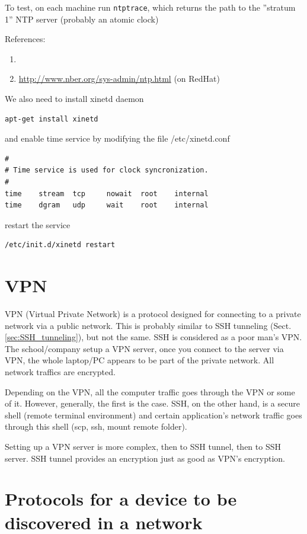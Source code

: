   
To test, on each machine run \verb!ntptrace!, which returns the path to the
''stratum 1'' NTP server (probably an atomic clock)



References:
\begin{enumerate}
  \item {}
  \item \url{http://www.nber.org/sys-admin/ntp.html} (on RedHat)
\end{enumerate}


We also need to install xinetd daemon
\begin{verbatim}
apt-get install xinetd
\end{verbatim}
and enable time service by modifying the file /etc/xinetd.conf
\begin{verbatim}
#
# Time service is used for clock syncronization.
#
time    stream  tcp     nowait  root    internal
time    dgram   udp     wait    root    internal
\end{verbatim}
restart the service
\begin{verbatim}
/etc/init.d/xinetd restart
\end{verbatim}



\section{VPN}
\label{sec:VPN}

VPN (Virtual Private Network) is a protocol designed for connecting to a private
network via a public network. This is probably similar to SSH
tunneling (Sect.\ref{sec:SSH_tunneling}), but not the same. SSH is considered as
a poor man's VPN. The school/company setup a VPN server, once you
connect to the server via VPN, the whole laptop/PC appears to be part of the
private network. All network traffics are encrypted. 

Depending on the VPN, all the computer traffic goes through the VPN or some of
it. However, generally, the first is the case. SSH, on the other hand, is a
secure shell (remote terminal environment) and certain application's network
traffic goes through this shell (scp, ssh, mount remote folder). 

Setting up a VPN server is more complex, then to SSH tunnel, then to SSH server.
SSH tunnel provides an encryption just as good as VPN's encryption.

\section{Protocols for a device to be discovered in a network}

